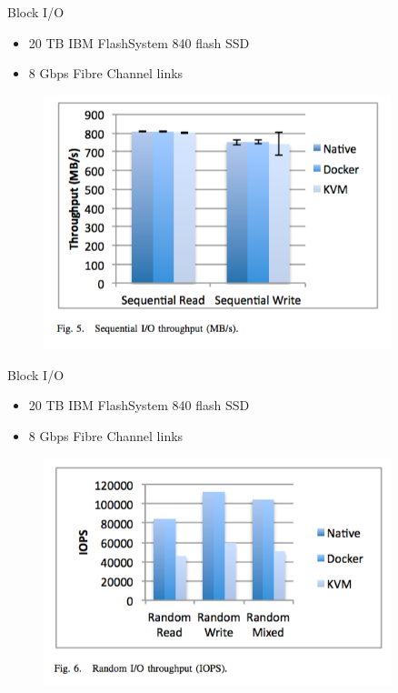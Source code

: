 \documentclass[compress]{beamer}
\begin{document}
\begin{frame}{Block I/O}
	\begin{itemize}
		\item 20 TB IBM FlashSystem 840 flash SSD
		\item 8 Gbps Fibre Channel links
	\end{itemize}
\begin{figure}[H]
  \centering
  \includegraphics[width=0.9\textwidth]{images/block}
    \label{fig:dynamic}
\end{figure}	
\end{frame}

\begin{frame}{Block I/O}
	\begin{itemize}
		\item 20 TB IBM FlashSystem 840 flash SSD
		\item 8 Gbps Fibre Channel links
	\end{itemize}
\begin{figure}[H]
  \centering
  \includegraphics[width=0.9\textwidth]{images/block2}
    \label{fig:dynamic}
\end{figure}	
\end{frame}
\end{document}
